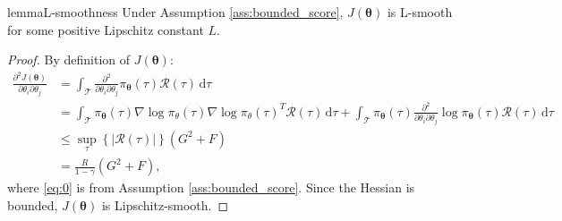 \documentclass{article}
\theoremstyle{remark}
\theoremstyle{definition}
\newcommand{\Dij}[2]{\frac{\partial^{2}{#1}}{\partial{#2}_i\partial{#2}_j}}
\newcommand{\de}{\,\mathrm{d}}
\newcommand{\vtheta}{\boldsymbol{\theta}}
\newcommand{\Tspace}{\mathcal{T}}
\newcommand{\Reward}{\mathcal{R}}
\newcommand{\pol}{\pi_{\vtheta}}
\newcommand{\score}[2]{\nabla\log\pi_{#1}(#2)}
\newcommand{\GRADLOG}{G}
\newcommand{\HESSLOG}{F}
\begin{document}
 
\begin{restatable}[]{lemma}{L-smoothness}\label{lemma:lsmooth}
	Under Assumption \ref{ass:bounded_score}, $J(\vtheta)$ is L-smooth for some positive Lipschitz constant $L$.
\end{restatable}
\begin{proof}
By definition of $J(\vtheta)$:
\begin{align}
\Dij{J(\vtheta)}{\theta} 
&= \int_{\Tspace}\Dij{}{\theta}\pol(\tau)\Reward(\tau)\de \tau
\nonumber\\ 
&= \int_{\Tspace}\pol(\tau)\score{\theta}{\tau}\score{\theta}{\tau}^T\Reward(\tau)\de \tau + \int_{\Tspace}\pol(\tau)\Dij{}{\theta}\log\pol(\tau)\Reward(\tau)\de \tau \nonumber\\
&\leq \sup_{\tau} \left\{\left|\Reward(\tau)\right|\right\} \left(\GRADLOG^2+\HESSLOG\right) \label{eq:0}\\
&= \frac{R}{1-\gamma}\left(\GRADLOG^2+\HESSLOG\right),\nonumber
\end{align}
where \ref{eq:0} is from Assumption \ref{ass:bounded_score}.
Since the Hessian is bounded, $J(\vtheta)$ is Lipschitz-smooth.
\end{proof}
\end{document}
